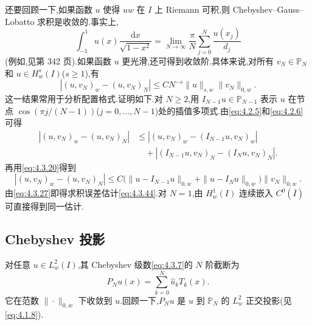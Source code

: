 还要回顾一下,如果函数 \(u\) 使得 \(uw\) 在 \(I\) 上 Riemann 可积,则 Chebyshev--Gauss--Lobatto 求积是收敛的.事实上,
\begin{equation}\label{eq:4.3.43}
  \int_{-1}^1 u(x)\frac{\mathrm dx}{\sqrt{1-x^2}}
   =\lim_{N\to\infty}\frac\pi N\sum_{j=0}^N\frac{u(x_j)}{d_j}
\end{equation}
(例如,见第 342 页).如果函数 \(u\) 更光滑,还可得到收敛阶.具体来说,对所有 \(v_N\in\mathbb P_N\) 和 \(u\in H_w^s(I)\)(\(s\ge1\)),有
\begin{equation}\label{eq:4.3.44}
  |(u,v_N)_w-(u,v_N)_N|
  \le CN^{-s}\|u\|_{s,w}\|v_N\|_{0,w}.
\end{equation}
这一结果常用于分析配置格式.证明如下.对 \(N\ge2\),用 \(I_{N-1}u\in\mathbb P_{N-1}\) 表示 \(u\) 在节点 \(\cos(\pi j/(N-1))\)(\(j=0,\ldots,N-1\))处的插值多项式.由\eqref{eq:4.2.5}和\eqref{eq:4.2.6}可得
\[
  \begin{aligned}
    |(u,v_N)_w-(u,v_N)_N|
    &\le |(u,v_N)_w-(I_{N-1}u,v_N)_w|\\
    &\quad+|(I_{N-1}u,v_N)_N-(I_Nu,v_N)_N|.
  \end{aligned}
\]
再用\eqref{eq:4.3.20}得到
\[
  |(u,v_N)_w-(u,v_N)_N|
   \le C\bigl(\|u-I_{N-1}u\|_{0,w}+\|u-I_Nu\|_{0,w}\bigr)\|v_N\|_{0,w}.
\]
由\eqref{eq:4.3.27}即得求积误差估计\eqref{eq:4.3.44}.对 \(N=1\),由 \(H_w^1(I)\) 连续嵌入 \(C^0(\overline I)\) 可直接得到同一估计.

\subsection{Chebyshev 投影}\label{sec:4.3.3}

对任意 \(u\in L_w^2(I)\),其 Chebyshev 级数\eqref{eq:4.3.7}的 \(N\) 阶截断为
\begin{equation}\label{eq:4.3.45}
  P_Nu(x)=\sum_{k=0}^N\widehat u_k T_k(x).
\end{equation}
它在范数 \(\|\cdot\|_{0,w}\) 下收敛到 \(u\).回顾一下,\(P_Nu\) 是 \(u\) 到 \(\mathbb P_N\) 的 \(L_w^2\) 正交投影(见\eqref{eq:4.1.8}).

